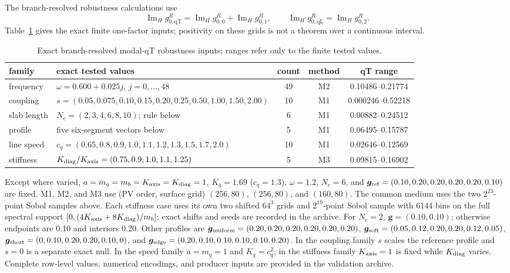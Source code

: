 \documentclass[10pt,aps,pre,onecolumn,notitlepage,nofootinbib]{revtex4-2}
\newcommand{\qT}{\mathrm{qT}}
\newcommand{\qL}{\mathrm{qL}}
\newcommand{\ImH}{\operatorname{Im}_{\!H}}
\begin{document}
The branch-resolved robustness calculations use
\begin{equation}
 \ImH g_{0,\qT}^R=\ImH g_{0,0}^R+\ImH g_{0,1}^R,
 \qquad
 \ImH g_{0,\qL}^R=\ImH g_{0,2}^R.
\end{equation}
Table~\ref{tab:sm-modal-robust} gives the exact finite one-factor inputs; positivity on these grids is not a theorem over a continuous interval.

\begin{table}[!htbp]
\caption{Exact branch-resolved modal-qT robustness inputs; ranges refer only to the finite tested values.}
\label{tab:sm-modal-robust}
\centering\scriptsize\setlength{\tabcolsep}{2.8pt}\renewcommand{\arraystretch}{0.96}
\begin{tabular}{@{}llccc@{}}\toprule
family&exact tested values&count&method&qT range\\\midrule
frequency&$\omega=0.600+0.025j$, $j=0,\ldots,48$&49&M2&0.10486--0.21774\\
coupling&$s=(0.05,0.075,0.10,0.15,0.20,0.25,0.50,1.00,1.50,2.00)$&10&M1&0.000246--0.52218\\
slab length&$N_c=(2,3,4,6,8,10)$; rule below&6&M1&0.00882--0.24512\\
profile&five six-segment vectors below&5&M1&0.06495--0.15787\\
line speed&$c_q=(0.65,0.8,0.9,1.0,1.1,1.2,1.3,1.5,1.7,2.0)$&10&M1&0.02646--0.12569\\
stiffness&$K_{\rm diag}/K_{\rm axis}=(0.75,0.9,1.0,1.1,1.25)$&5&M3&0.09815--0.16902\\\bottomrule
\end{tabular}

\parbox{0.99\linewidth}{\scriptsize Except where varied, $a=m_q=m_b=K_{\rm axis}=K_{\rm diag}=1$, $K_q=1.69$ ($c_q=1.3$), $\omega=1.2$, $N_c=6$, and $\bm g_{\rm ref}=(0.10,0.20,0.20,0.20,0.20,0.10)$ are fixed. M1, M2, and M3 use (PV order, surface grid) $(256,80)$, $(256,80)$, and $(160,80)$. The common medium uses the two $2^{23}$-point Sobol samples above. Each stiffness case uses its own two shifted $64^3$ grids and $2^{19}$-point Sobol sample with 6144 bins on the full spectral support $[0,(4K_{\rm axis}+8K_{\rm diag})/m_b]$; exact shifts and seeds are recorded in the archive. For $N_c=2$, $\bm g=(0.10,0.10)$; otherwise endpoints are 0.10 and interiors 0.20. Other profiles are $\bm g_{\rm uniform}=(0.20,0.20,0.20,0.20,0.20,0.20)$, $\bm g_{\rm soft}=(0.05,0.12,0.20,0.20,0.12,0.05)$, $\bm g_{\rm short}=(0,0.10,0.20,0.20,0.10,0)$, and $\bm g_{\rm edge}=(0.20,0.10,0.10,0.10,0.10,0.20)$. In the coupling family $s$ scales the reference profile and $s=0$ is a separate exact null. In the speed family $a=m_q=1$ and $K_q=c_q^2$; in the stiffness family $K_{\rm axis}=1$ is fixed while $K_{\rm diag}$ varies. Complete row-level values, numerical encodings, and producer inputs are provided in the validation archive.}
\end{table}
\end{document}
